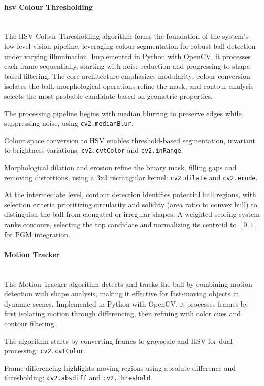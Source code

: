 \documentclass[12pt,a4paper]{article}
\begin{document}
\paragraph{\acs{hsv} Colour Thresholding}
\mbox{}\\
The HSV Colour Thresholding algorithm forms the foundation of the system's low-level vision pipeline, leveraging colour segmentation for robust ball detection under varying illumination. Implemented in Python with OpenCV, it processes each frame sequentially, starting with noise reduction and progressing to shape-based filtering. The core architecture emphasizes modularity: colour conversion isolates the ball, morphological operations refine the mask, and contour analysis selects the most probable candidate based on geometric properties.

The processing pipeline begins with median blurring to preserve edges while suppressing noise, using \texttt{cv2.medianBlur}.

Colour space conversion to HSV enables threshold-based segmentation, invariant to brightness variations: \texttt{cv2.cvtColor} and \texttt{cv2.inRange}.

Morphological dilation and erosion refine the binary mask, filling gaps and removing distortions, using a 3x3 rectangular kernel: \texttt{cv2.dilate} and \texttt{cv2.erode}.

At the intermediate level, contour detection identifies potential ball regions, with selection criteria prioritizing circularity and solidity (area ratio to convex hull) to distinguish the ball from elongated or irregular shapes. A weighted scoring system ranks contours, selecting the top candidate and normalizing its centroid to $[0,1]$ for PGM integration.

\paragraph{Motion Tracker}
\mbox{}\\
The Motion Tracker algorithm detects and tracks the ball by combining motion detection with shape analysis, making it effective for fast-moving objects in dynamic scenes. Implemented in Python with OpenCV, it processes frames by first isolating motion through differencing, then refining with color cues and contour filtering.

The algorithm starts by converting frames to grayscale and HSV for dual processing: \texttt{cv2.cvtColor}.

Frame differencing highlights moving regions using absolute difference and thresholding: \texttt{cv2.absdiff} and \texttt{cv2.threshold}.
\end{document}

